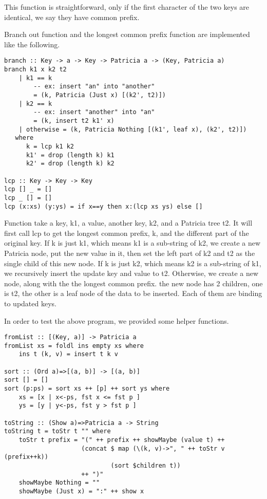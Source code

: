 \documentclass{article}
\begin{document}
This function is straightforward, only if the first character of the two keys
are identical, we say they have common prefix.

Branch out function and the longest common prefix function are implemented like
the following.

\begin{lstlisting}
branch :: Key -> a -> Key -> Patricia a -> (Key, Patricia a)
branch k1 x k2 t2
    | k1 == k
        -- ex: insert "an" into "another"
        = (k, Patricia (Just x) [(k2', t2)])
    | k2 == k
        -- ex: insert "another" into "an"
        = (k, insert t2 k1' x)
    | otherwise = (k, Patricia Nothing [(k1', leaf x), (k2', t2)])
   where
      k = lcp k1 k2
      k1' = drop (length k) k1
      k2' = drop (length k) k2

lcp :: Key -> Key -> Key
lcp [] _ = []
lcp _ [] = []
lcp (x:xs) (y:ys) = if x==y then x:(lcp xs ys) else []
\end{lstlisting}

Function take a key, k1, a value, another key, k2, and a Patricia tree t2. It will first
call lcp to get the longest common prefix, k, and the different part of the original key.
If k is just k1, which means k1 is a sub-string of k2, we create a new Patricia node,
put the new value in it, then set the left part of k2 and t2 as the single child of this
new node. If k is just k2, which means k2 is a sub-string of k1, we recursively insert
the update key and value to t2. Otherwise, we create a new node, along with the the longest
common prefix. the new node has 2 children, one is t2, the other is a leaf node of the data
to be inserted. Each of them are binding to updated keys.

In order to test the above program, we provided some helper functions.

\begin{lstlisting}
fromList :: [(Key, a)] -> Patricia a
fromList xs = foldl ins empty xs where
    ins t (k, v) = insert t k v

sort :: (Ord a)=>[(a, b)] -> [(a, b)]
sort [] = []
sort (p:ps) = sort xs ++ [p] ++ sort ys where
    xs = [x | x<-ps, fst x <= fst p ]
    ys = [y | y<-ps, fst y > fst p ]

toString :: (Show a)=>Patricia a -> String
toString t = toStr t "" where
    toStr t prefix = "(" ++ prefix ++ showMaybe (value t) ++
                     (concat $ map (\(k, v)->", " ++ toStr v (prefix++k))
                             (sort $children t))
                     ++ ")"
    showMaybe Nothing = ""
    showMaybe (Just x) = ":" ++ show x
\end{lstlisting}
\end{document}
